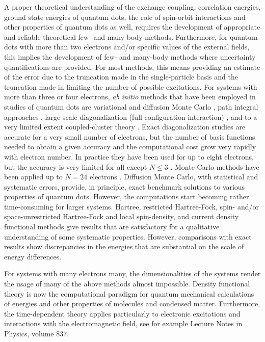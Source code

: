 \documentclass[twocolumn]{revtex4}
\begin{document}
A proper theoretical understanding of the exchange coupling, correlation energies, 
ground state energies of quantum dots, the role of spin-orbit interactions
and other properties of quantum dots as well, requires the development of appropriate and reliable  
theoretical  few- and many-body methods. 
Furthermore, for quantum dots with more than two electrons and/or specific values of the 
external fields, this implies the development of few- and many-body methods where   
uncertainty
quantifications are provided.  
For most methods, this means providing an estimate of the error due 
to the truncation made in the single-particle basis and the truncation made in 
limiting the number of possible excitations.
For systems with more than three or four electrons,  {\em ab initio} methods that have 
been employed in studies of quantum dots are
 variational and diffusion Monte Carlo \cite{harju2005,pederiva2001, pederiva2003}, path integral approaches \cite{pi1999}, 
large-scale diagonalization (full configuration 
interaction) \cite{Eto97,Maksym90,simen2008,modena2000}, and to a very limited extent 
coupled-cluster theory \cite{shavittbartlett2009,bartlett2007,bartlett2003,indians,us2011}. 
Exact diagonalization studies are accurate for a very small number
of electrons, but the number of basis functions needed to obtain a given
accuracy and the computational cost grow very rapidly with electron number.
In practice they have been used for up to eight electrons\cite{Eto97,Maksym90,modena2000}, but the accuracy is
very limited for all except $N\le 3$ .  
Monte Carlo methods have been applied up to $N=24$ electrons 
\cite{pederiva2001,pederiva2003}. Diffusion Monte Carlo, with statistical and systematic errors, provide, in principle,
exact benchmark solutions to various properties of quantum dots. However, 
the computations start becoming rather time-consuming for larger systems.   
Hartree\cite{Kum90}, restricted Hartree-Fock, spin- and/or space-unrestricted
Hartree-Fock\cite{Fuj96,Mul96,Yan99} and
local spin-density, and current density functional methods\cite{Kos97,Hir99,finns1,finns2}
give results that are satisfactory for a qualitative understanding of some
systematic properties. However, comparisons with exact results show
discrepancies in the energies that are substantial
on the scale of energy differences. 

For systems with many electrons many, the dimensionalities of the systems render the usage of many of the above methods almost impossible. Density functional theory is now the computational paradigm for quantum mechanical calculations of energies and other properties of molecules and condensed matter. Furthermore, the 
time-dependent theory applies particularly to electronic excitations and interactions with 
the electromagnetic field, see for example Lecture Notes in Physics, volume 837. 
\end{document}
